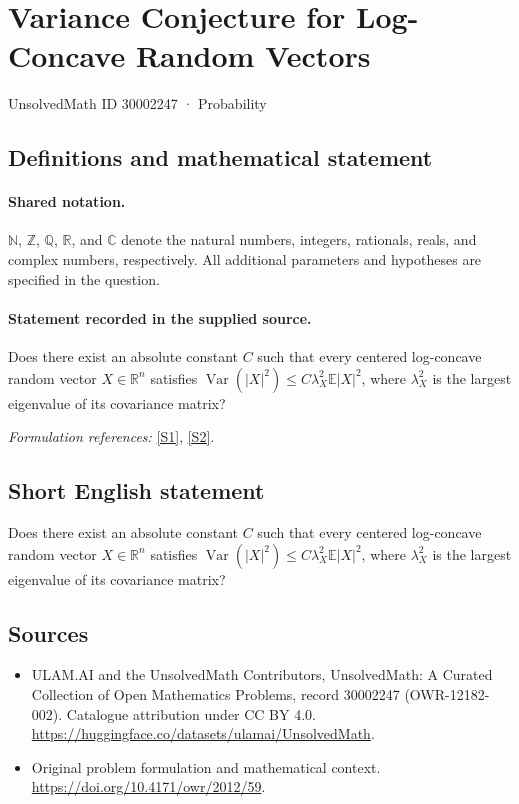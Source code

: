 \documentclass[11pt]{article}
\newcommand{\sref}[2]{\hyperlink{source:#1:#2}{[S#2]}}
\begin{document}
\setcounter{section}{30002246}
\section{Variance Conjecture for Log-Concave Random Vectors}\label{30002247}
{\small UnsolvedMath ID 30002247 · Probability}
\subsection{Definitions and mathematical statement}

\paragraph{Shared notation.}$\mathbb N$, $\mathbb Z$, $\mathbb Q$, $\mathbb R$, and $\mathbb C$ denote the natural numbers, integers, rationals, reals, and complex numbers, respectively. All additional parameters and hypotheses are specified in the question.


\paragraph{Statement recorded in the supplied source.}
Does there exist an absolute constant $C$ such that every centered log-concave random vector $X\in\mathbb R^n$ satisfies $\operatorname{Var}(|X|^2)\leq C\lambda_X^2\mathbb E|X|^2$, where $\lambda_X^2$ is the largest eigenvalue of its covariance matrix?
\par\smallskip\textit{Formulation references:} \sref{30002247}{1}, \sref{30002247}{2}.
\subsection{Short English statement}
Does there exist an absolute constant $C$ such that every centered log-concave random vector $X\in\mathbb R^n$ satisfies $\operatorname{Var}(|X|^2)\leq C\lambda_X^2\mathbb E|X|^2$, where $\lambda_X^2$ is the largest eigenvalue of its covariance matrix?
\subsection{Sources}
\begin{itemize}
\item[\hypertarget{source:30002247:1}{S1}] ULAM.AI and the UnsolvedMath Contributors, UnsolvedMath: A Curated Collection of Open Mathematics Problems, record 30002247 (OWR-12182-002). Catalogue attribution under CC BY 4.0.
\url{https://huggingface.co/datasets/ulamai/UnsolvedMath}.
\item[\hypertarget{source:30002247:2}{S2}] Original problem formulation and mathematical context.
\url{https://doi.org/10.4171/owr/2012/59}.
\end{itemize}
\label{end:30002247}
\end{document}

